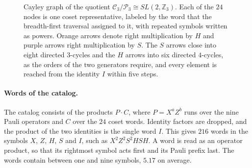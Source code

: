 \begin{figure}[tb]
{
  }
  \caption{Cayley graph of the quotient $\mathcal{C}_3/\mathcal{P}_3 \cong SL(2,\mathbb{Z}_3)$. Each of the $24$ nodes is one coset representative, labeled by the word that the breadth-first traversal assigned to it, with repeated symbols written as powers. Orange arrows denote right multiplication by $H$ and purple arrows right multiplication by $S$. The $S$ arrows close into eight directed $3$-cycles and the $H$ arrows into six directed $4$-cycles, as the orders of the two generators require, and every element is reached from the identity $I$ within five steps.}
  \label{fig:cayley-c3modp3}
\end{figure}

\paragraph{Words of the catalog.}
The catalog consists of the products $P \cdot C$, where $P = X^a Z^b$ runs over the nine Pauli operators and $C$ over the $24$ coset words. Identity factors are dropped, and the product of the two identities is the single word $I$. This gives $216$ words in the symbols $X$, $Z$, $H$, $S$ and $I$, such as $X^2Z^2S^2HSH$. A word is read as an operator product, so that its rightmost symbol acts first and its Pauli prefix last. The words contain between one and nine symbols, $5.17$ on average.

